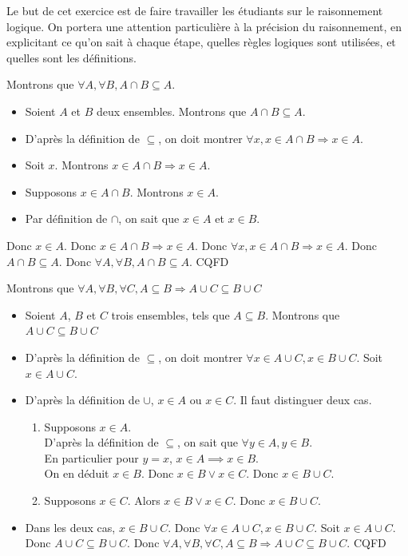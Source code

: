 \begin{corrections}
  
  Le but de cet exercice est de faire travailler les étudiants sur le raisonnement logique.
  On portera une attention particulière à la précision du raisonnement, en explicitant
  ce qu'on sait à chaque étape, quelles règles logiques sont utilisées, et quelles sont les définitions. 

  \begin{questions}
  \item Montrons que $\forall A, \forall B, A\cap B \subseteq A$.
    \begin{itemize}
    \item Soient $A$ et $B$ deux ensembles. Montrons que $A\cap B \subseteq A$.
    \item D'après la définition de $\subseteq$, on doit montrer $\forall x, x \in A\cap B \Rightarrow x\in A$.
    \item Soit $x$. Montrons $x \in A\cap B \Rightarrow x\in A$. 
    \item Supposons $x \in A\cap B$. Montrons $x\in A$.
    \item Par définition de $\cap$, on sait que $x \in A$ et $x\in B$.
    \end{itemize}
    Donc $x\in A$. Donc $x \in A\cap B \Rightarrow x\in A$. Donc $\forall x, x \in A\cap B \Rightarrow x\in A$.
    Donc $A\cap B \subseteq A$. Donc $\forall A, \forall B, A\cap B \subseteq A$. CQFD
  \item Montrons que $\forall A, \forall B, \forall C, A\subseteq B \Rightarrow A\cup C \subseteq B \cup C$
    \begin{itemize}
    \item Soient $A$, $B$ et $C$ trois ensembles, tels que $A\subseteq B$. Montrons que $A\cup C \subseteq B \cup C$
    \item D'après la définition de $\subseteq$, on doit montrer $\forall x \in A\cup C, x\in B \cup C$. Soit $x \in A\cup C$.  
    \item D'après la définition de $\cup$, $x \in A$ ou $x\in C$. Il faut distinguer deux cas. 
      \begin{enumerate}
      \item Supposons $x \in A$. \\
        D'après la définition de $\subseteq$, on sait que $\forall y \in A, y\in B$. \\
        En particulier pour $y=x$, $x \in A \implies x\in B$. \\
        On en déduit $x\in B$. Donc $x\in B \lor x\in C$. Donc $x\in B \cup C$.
      \item Supposons $x \in C$. Alors $x\in B \lor x\in C$. Donc $x\in B \cup C$.
      \end{enumerate}
    \item Dans les deux cas, $x\in B \cup C$. Donc $\forall x \in A\cup C, x\in B \cup C$. Soit $x \in A\cup C$.  Donc $A\cup C \subseteq B \cup C$. Donc $\forall A, \forall B, \forall C, A\subseteq B \Rightarrow A\cup C \subseteq B \cup C$. CQFD
    \end{itemize}
  \end{questions}

\end{corrections}

\endgroup
\endinput
